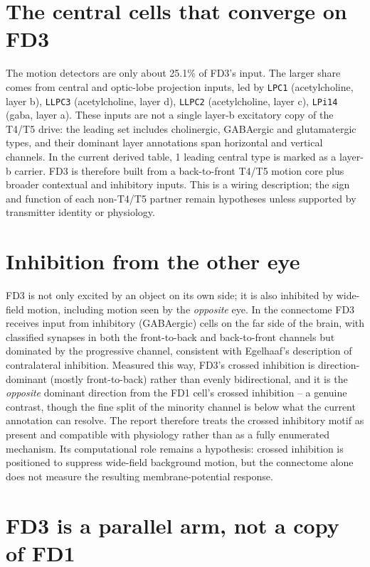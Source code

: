 \documentclass[11pt]{article}
\newcommand{\ttt}[1]{\texttt{#1}}
\begin{document}
\section{The central cells that converge on FD3}

The motion detectors are only about 25.1\% of FD3's input. The larger share comes from central and optic-lobe projection inputs, led by \ttt{LPC1} (acetylcholine, layer b), \ttt{LLPC3} (acetylcholine, layer d), \ttt{LLPC2} (acetylcholine, layer c), \ttt{LPi14} (gaba, layer a). These inputs are not a single layer-b excitatory copy of the T4/T5 drive: the leading set includes cholinergic, GABAergic and glutamatergic types, and their dominant layer annotations span horizontal and vertical channels. In the current derived table, 1 leading central type is marked as a layer-b carrier. FD3 is therefore built from a back-to-front T4/T5 motion core plus broader contextual and inhibitory inputs. This is a wiring description; the sign and function of each non-T4/T5 partner remain hypotheses unless supported by transmitter identity or physiology.

\section{Inhibition from the other eye}

FD3 is not only excited by an object on its own side; it is also inhibited by wide-field motion, including motion seen by the \emph{opposite} eye. In the connectome FD3 receives input from inhibitory (GABAergic) cells on the far side of the brain, with classified synapses in both the front-to-back and back-to-front channels but dominated by the progressive channel, consistent with Egelhaaf's description of contralateral inhibition. Measured this way, FD3's crossed inhibition is direction-dominant (mostly front-to-back) rather than evenly bidirectional, and it is the \emph{opposite} dominant direction from the FD1 cell's crossed inhibition -- a genuine contrast, though the fine split of the minority channel is below what the current annotation can resolve. The report therefore treats the crossed inhibitory motif as present and compatible with physiology rather than as a fully enumerated mechanism. Its computational role remains a hypothesis: crossed inhibition is positioned to suppress wide-field background motion, but the connectome alone does not measure the resulting membrane-potential response.

\section{FD3 is a parallel arm, not a copy of FD1}
\end{document}
